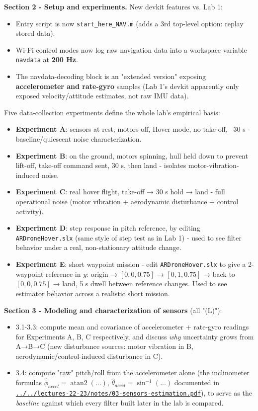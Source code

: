 \documentclass[11pt]{article}
\begin{document}
\textbf{Section 2 - Setup and experiments.} New devkit features vs. Lab 1:
\begin{itemize}
\item Entry script is now \texttt{start\_\allowbreak{}here\_\allowbreak{}NAV.m} (adds a 3rd top-level option: replay stored data).
\item Wi-Fi control modes now log raw navigation data into a workspace variable \texttt{navdata} at \textbf{200 Hz}.
\item The navdata-decoding block is an "extended version" exposing \textbf{accelerometer and rate-gyro} samples (Lab 1's devkit apparently only exposed velocity/attitude estimates, not raw IMU data).
\end{itemize}

Five data-collection experiments define the whole lab's empirical basis:
\begin{itemize}
\item \textbf{Experiment A}: sensors at rest, motors off, Hover mode, no take-off, ~30 s - baseline/quiescent noise characterization.
\item \textbf{Experiment B}: on the ground, motors spinning, hull held down to prevent lift-off, take-off command sent, 30 s, then land - isolates motor-vibration-induced noise.
\item \textbf{Experiment C}: real hover flight, take-off → 30 s hold → land - full operational noise (motor vibration + aerodynamic disturbance + control activity).
\item \textbf{Experiment D}: step response in pitch reference, by editing \texttt{ARDroneHover.slx} (same style of step test as in Lab 1) - used to see filter behavior under a real, non-stationary attitude change.
\item \textbf{Experiment E}: short waypoint mission - edit \texttt{ARDroneHover.slx} to give a 2-waypoint reference in $y$: origin → $[0,0,0.75]$ → $[0,1,0.75]$ → back to $[0,0,0.75]$ → land, 5 s dwell between reference changes. Used to see estimator behavior across a realistic short mission.
\end{itemize}

\textbf{Section 3 - Modeling and characterization of sensors} (all "(L)"):
\begin{itemize}
\item 3.1-3.3: compute mean and covariance of accelerometer + rate-gyro readings for Experiments A, B, C respectively, and discuss \textit{why} uncertainty grows from A→B→C (new disturbance sources: motor vibration in B, aerodynamic/control-induced disturbance in C).
\item 3.4: compute "raw" pitch/roll from the accelerometer alone (the inclinometer formulas $\hat\phi_{accel} = \operatorname{atan2}(...)$, $\hat\theta_{accel} = \sin^{-1}(...)$ documented in \href{../../lectures-22-23/notes/03-sensors-estimation.pdf}{\texttt{../../lectures-22-23/notes/03-\allowbreak{}sensors-\allowbreak{}estimation.pdf}}), to serve as the \textit{baseline} against which every filter built later in the lab is compared.
\end{itemize}
\end{document}

